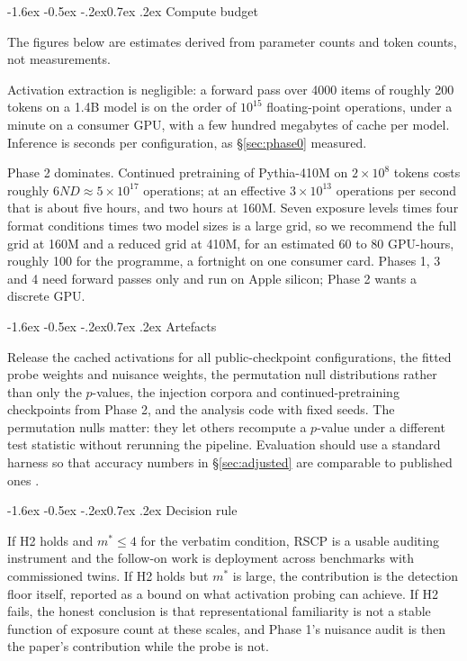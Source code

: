 \documentclass[10pt,twocolumn,letterpaper]{article}
\makeatletter
\renewcommand\subsection{\@startsection{subsection}{2}{\z@}%
  {-1.6ex \@plus -0.5ex \@minus -.2ex}{0.7ex \@plus .2ex}%
  {\normalfont\normalsize\bfseries}}
\makeatother
\begin{document}
\subsection{Compute budget}

The figures below are estimates derived from parameter counts and token counts, not measurements.

Activation extraction is negligible: a forward pass over 4000 items of roughly 200 tokens on a 1.4B model is on the order of $10^{15}$ floating-point operations, under a minute on a consumer GPU, with a few hundred megabytes of cache per model. Inference is seconds per configuration, as \S\ref{sec:phase0} measured.

Phase 2 dominates. Continued pretraining of Pythia-410M on $2\times10^{8}$ tokens costs roughly $6ND\approx 5\times10^{17}$ operations; at an effective $3\times10^{13}$ operations per second that is about five hours, and two hours at 160M. Seven exposure levels times four format conditions times two model sizes is a large grid, so we recommend the full grid at 160M and a reduced grid at 410M, for an estimated 60 to 80 GPU-hours, roughly 100 for the programme, a fortnight on one consumer card. Phases 1, 3 and 4 need forward passes only and run on Apple silicon; Phase 2 wants a discrete GPU.

\subsection{Artefacts}

Release the cached activations for all public-checkpoint configurations, the fitted probe weights and nuisance weights, the permutation null distributions rather than only the $p$-values, the injection corpora and continued-pretraining checkpoints from Phase 2, and the analysis code with fixed seeds. The permutation nulls matter: they let others recompute a $p$-value under a different test statistic without rerunning the pipeline. Evaluation should use a standard harness so that accuracy numbers in \S\ref{sec:adjusted} are comparable to published ones \cite{gao2024harness,wolf2020transformers}.

\subsection{Decision rule}

If H2 holds and $m^{*}\le 4$ for the verbatim condition, RSCP is a usable auditing instrument and the follow-on work is deployment across benchmarks with commissioned twins. If H2 holds but $m^{*}$ is large, the contribution is the detection floor itself, reported as a bound on what activation probing can achieve. If H2 fails, the honest conclusion is that representational familiarity is not a stable function of exposure count at these scales, and Phase 1's nuisance audit is then the paper's contribution while the probe is not.
\end{document}
